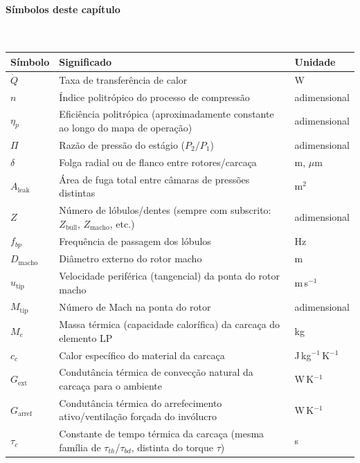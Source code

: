 \documentclass[12pt,a4paper]{article}
\numberwithin{equation}{section}
\numberwithin{table}{section}
\numberwithin{figure}{section}
\begin{document}
{\paragraph{Símbolos deste capítulo}\mbox{}\\[-0.5em]
{\small
\begin{longtable}{>{\raggedright\arraybackslash}p{2.6cm} >{\raggedright\arraybackslash}p{9.2cm} >{\raggedright\arraybackslash}p{2.6cm}}
	\toprule
	\textbf{Símbolo} & \textbf{Significado} & \textbf{Unidade} \\ \midrule
	\endhead
	$\dot{Q}$ & Taxa de transferência de calor & W \\
	$n$ & Índice politrópico do processo de compressão & adimensional \\
	$\eta_p$ & Eficiência politrópica (aproximadamente constante ao longo do mapa de operação) & adimensional \\
	$\Pi$ & Razão de pressão do estágio ($P_2/P_1$) & adimensional \\
	$\delta$ & Folga radial ou de flanco entre rotores/carcaça & m, $\mu$m \\
	$A_{\text{leak}}$ & Área de fuga total entre câmaras de pressões distintas & m$^2$ \\
	$Z$ & Número de lóbulos/dentes (sempre com subscrito: $Z_{\text{bull}}$, $Z_{\text{macho}}$, etc.) & adimensional \\
	$f_{bp}$ & Frequência de passagem dos lóbulos & Hz \\
	$D_{\text{macho}}$ & Diâmetro externo do rotor macho & m \\
	$u_{\text{tip}}$ & Velocidade periférica (tangencial) da ponta do rotor macho & m\,s$^{-1}$ \\
	$M_{\text{tip}}$ & Número de Mach na ponta do rotor & adimensional \\
	$M_c$ & Massa térmica (capacidade calorífica) da carcaça do elemento LP & kg \\
	$c_c$ & Calor específico do material da carcaça & J\,kg$^{-1}$\,K$^{-1}$ \\
	$G_{\text{ext}}$\dag & Condutância térmica de convecção natural da carcaça para o ambiente & W\,K$^{-1}$ \\
	$G_{\text{arref}}$\dag & Condutância térmica do arrefecimento ativo/ventilação forçada do invólucro & W\,K$^{-1}$ \\
	$\tau_c$\dag & Constante de tempo térmica da carcaça (mesma família de $\tau_{th}$/$\tau_{bd}$, distinta do torque $\tau$) & s \\
	\bottomrule
\end{longtable}
}


}
\end{document}
